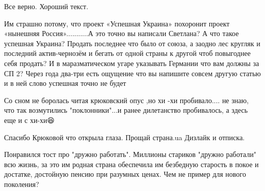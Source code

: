 \begin{itemize}
 
Все верно. Хороший текст.

 

Им страшно потому, что проект «Успешная Украина» похоронит проект «нынешняя
Россия»...........А это точно вы написали Светлана? А что такое успешная
Украина? Продать последнее что было от союза, а заодно лес кругляк и последний
актив-чернозём и бегать от одной страны к другой чтоб повыгоднее себя продать? И
в маразматическом угаре указывать Германии что вам должны за СП 2? Через года
два-три есть ощущение что вы напишите совсем другую статью и в ней слово
успешная точно не будет


 

Со сном не боролась читая крюковский опус ,но хи -хи пробивало.... не знаю, что
так возмутились "поклонники"...и ранее дилетанство пробивалось, а здесь еще и с
хи-хи😆


 
Спасибо Крюковой что открыла глаза. Прощай страна.ua Дизлайк и отписка.

 

Понравился тост про "дружно работать". Миллионы стариков "дружно работали" всю
жизнь, за это им родная страна обеспечила им безбедную старость в покое и
достатке, достойную пенсию при разумных ценах. Чем не пример для нового
поколения?



\end{itemize}

